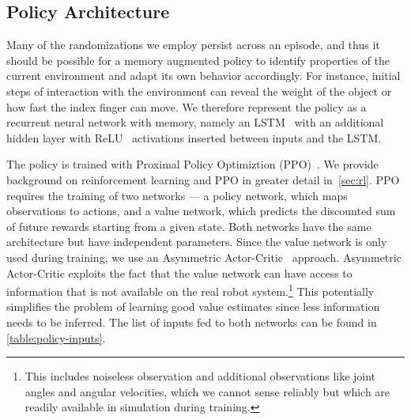 


\subsection{Policy Architecture}


Many of the randomizations we employ persist across an episode, and thus it should be possible for a memory augmented policy to identify properties of the current environment and adapt its own behavior accordingly.
For instance, initial steps of interaction with the environment can reveal the weight of the object or how fast the index finger can move.
We therefore represent the policy as a recurrent neural network with memory, namely an LSTM~\citep{lstm}
with an additional hidden layer with ReLU~\citep{relu} activations inserted
between inputs and the LSTM.

The policy is trained with Proximal Policy Optimiztion (PPO)~\citep{ppo}.
We provide background on reinforcement learning and PPO in greater detail in~\autoref{sec:rl}.
PPO requires the training of two networks --- a policy network, which maps observations to actions, and a value network, which predicts the discounted sum of future rewards starting from a given state.
Both networks have the same architecture but have independent parameters.
Since the value network is only used during training, we use an Asymmetric Actor-Critic~\citep{pinto2017asymmetric} approach.
Asymmetric Actor-Critic exploits the fact that the value network can have access to information that is not available on the real robot system.\footnote{This includes noiseless observation and additional observations like joint angles and angular velocities, which we cannot sense reliably but which are readily available in simulation during training.}
This potentially simplifies the problem of learning good value estimates since less information needs to be inferred.
The list of inputs fed to both networks can be found in \autoref{table:policy-inputs}.



